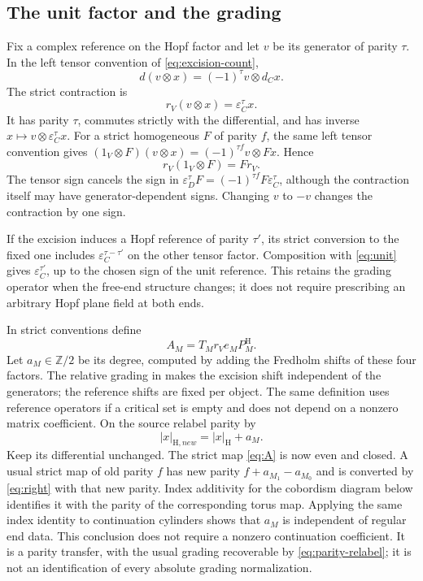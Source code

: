 \documentclass[11pt]{amsart}
\theoremstyle{definition}
\theoremstyle{remark}
\theoremstyle{plain}
\newcommand{\ZZ}{\mathbb Z}
\newcommand{\eps}{\varepsilon}
\begin{document}
\subsection{The unit factor and the grading}\label{sec:unit}
Fix a complex reference on the Hopf factor and let $v$ be its
generator of parity $\tau$. In the left tensor convention of
\eqref{eq:excision-count},
\[
 d(v\otimes x)=(-1)^\tau v\otimes d_Cx.
\]
The strict contraction is
\begin{equation}\label{eq:unit}
 r_V(v\otimes x)=\eps_C^\tau x.
\end{equation}
It has parity $\tau$, commutes strictly with the differential,
and has inverse $x\mapsto v\otimes\eps_C^\tau x$. For a strict
homogeneous $F$ of parity $f$, the same left tensor convention gives
$(1_V\otimes F)(v\otimes x)=(-1)^{\tau f}v\otimes Fx$. Hence
\begin{equation}\label{eq:unit-naturality}
 r_V(1_V\otimes F)=Fr_V.
\end{equation}
The tensor sign cancels the sign in
$\eps_D^\tau F=(-1)^{\tau f}F\eps_C^\tau$, although the
contraction itself may have generator-dependent signs. Changing
$v$ to $-v$ changes the contraction by one sign.

If the excision induces a Hopf reference of parity $\tau'$,
its strict conversion to the fixed one includes
$\eps_C^{\tau-\tau'}$ on the other tensor factor. Composition with
\eqref{eq:unit} gives $\eps_C^{\tau'}$, up to the chosen sign of
the unit reference. This retains the grading operator when the
free-end structure changes; it does not require prescribing an
arbitrary Hopf plane field at both ends.

In strict conventions define
\begin{equation}\label{eq:A}
 A_M=T_Mr_Ve_MP_M^{\mathrm H}.
\end{equation}
Let $a_M\in\ZZ/2$ be its degree, computed by adding the Fredholm
shifts of these four factors. The relative grading in
\cite[Proposition~5.7]{KM} makes the excision shift independent of
the generators; the reference shifts are fixed per object. The
same definition uses reference operators if a critical set is
empty and does not depend on a nonzero matrix coefficient.
On the source relabel parity by
\begin{equation}\label{eq:parity-relabel}
 |x|_{\mathrm H,new}=|x|_{\mathrm H}+a_M.
\end{equation}
Keep its differential unchanged. The strict map \eqref{eq:A} is
now even and closed. A usual strict map of old parity $f$ has new
parity $f+a_{M_1}-a_{M_0}$ and is converted by
\eqref{eq:right} with that new parity. Index additivity for the
cobordism diagram below identifies it with the parity of the
corresponding torus map. Applying the same index identity to
continuation cylinders shows that $a_M$ is independent of regular
end data. This conclusion does not require a nonzero continuation
coefficient. It is a parity transfer, with the usual grading
recoverable by \eqref{eq:parity-relabel}; it is not an identification
of every absolute grading normalization.
\end{document}
